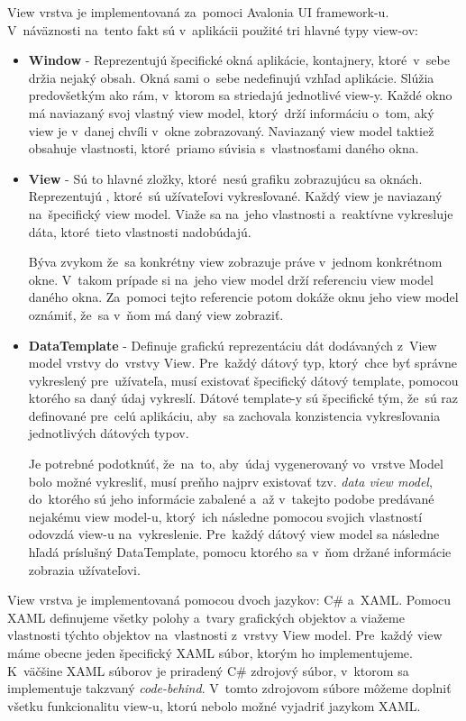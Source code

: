View vrstva je implementovaná za~pomoci Avalonia UI framework-u. V~náväznosti na~tento fakt sú v~aplikácii použité tri hlavné typy view-ov:
\begin{itemize}
    \item \textbf{Window} - Reprezentujú špecifické okná aplikácie,  kontajnery, ktoré~v~sebe držia nejaký obsah. Okná sami o~sebe nedefinujú vzhľad aplikácie. Slúžia predovšetkým ako rám, v~ktorom sa striedajú jednotlivé view-y. Každé okno má naviazaný svoj vlastný view model, ktorý~drží informáciu o~tom, aký view je v~danej chvíli v~okne zobrazovaný. Naviazaný view model taktiež obsahuje vlastnosti, ktoré~priamo súvisia s~vlastnosťami daného okna.
    \item \textbf{View} - Sú to hlavné zložky, ktoré~nesú grafiku zobrazujúcu sa oknách. Reprezentujú , ktoré~sú užívateľovi vykresľované. Každý view je naviazaný na~špecifický view model. Viaže sa na~jeho vlastnosti a~reaktívne vykresluje dáta, ktoré~tieto vlastnosti nadobúdajú. 
    
    Býva zvykom že~sa konkrétny view zobrazuje práve v~jednom konkrétnom okne. V~takom prípade si na~jeho view model drží referenciu view model daného okna. Za~pomoci tejto referencie potom dokáže oknu jeho view model oznámiť, že~sa v~ňom má daný view zobraziť. 
    \item \textbf{DataTemplate} - Definuje grafickú reprezentáciu dát dodávaných z~View model vrstvy do~vrstvy View. Pre~každý dátový typ, ktorý~chce byť správne vykreslený pre~užívateľa, musí existovať špecifický dátový template, pomocou ktorého sa daný údaj vykreslí. Dátové template-y sú špecifické tým, že~sú raz definované pre~celú aplikáciu, aby~sa zachovala konzistencia vykresľovania jednotlivých dátových typov.

    Je potrebné podotknúť, že~na~to, aby~údaj vygenerovaný vo~vrstve Model bolo možné vykresliť, musí preňho najprv existovať tzv. \textit{data view model}, do~ktorého sú jeho informácie zabalené a~až v~takejto podobe predávané nejakému view model-u, ktorý~ich následne pomocou svojich vlastností odovzdá view-u na~vykreslenie. Pre~každý dátový view model sa následne hľadá príslušný DataTemplate, pomocu ktorého sa v~ňom držané informácie zobrazia užívateľovi. 
\end{itemize}   

View vrstva je implementovaná pomocou dvoch jazykov: C\# a~XAML. Pomocu XAML definujeme všetky polohy a~tvary grafických objektov a viažeme vlastnosti týchto objektov na~vlastnosti z~vrstvy View model. Pre~každý view máme obecne jeden špecifický XAML súbor, ktorým ho implementujeme. K~väčšine XAML súborov je priradený C\# zdrojový súbor, v~ktorom sa implementuje takzvaný \textit{code-behind}. V~tomto zdrojovom súbore môžeme doplniť všetku funkcionalitu view-u, ktorú nebolo možné vyjadriť jazykom XAML.    

